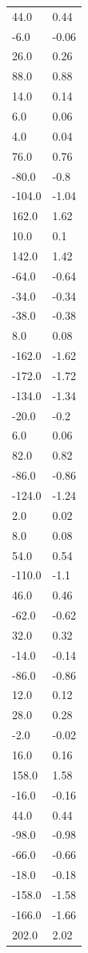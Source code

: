 \begin{longtable}{ll}
44.0 & 0.44 \\
-6.0 & -0.06 \\
26.0 & 0.26 \\
88.0 & 0.88 \\
14.0 & 0.14 \\
6.0 & 0.06 \\
4.0 & 0.04 \\
76.0 & 0.76 \\
-80.0 & -0.8 \\
-104.0 & -1.04 \\
162.0 & 1.62 \\
10.0 & 0.1 \\
142.0 & 1.42 \\
-64.0 & -0.64 \\
-34.0 & -0.34 \\
-38.0 & -0.38 \\
8.0 & 0.08 \\
-162.0 & -1.62 \\
-172.0 & -1.72 \\
-134.0 & -1.34 \\
-20.0 & -0.2 \\
6.0 & 0.06 \\
82.0 & 0.82 \\
-86.0 & -0.86 \\
-124.0 & -1.24 \\
2.0 & 0.02 \\
8.0 & 0.08 \\
54.0 & 0.54 \\
-110.0 & -1.1 \\
46.0 & 0.46 \\
-62.0 & -0.62 \\
32.0 & 0.32 \\
-14.0 & -0.14 \\
-86.0 & -0.86 \\
12.0 & 0.12 \\
28.0 & 0.28 \\
-2.0 & -0.02 \\
16.0 & 0.16 \\
158.0 & 1.58 \\
-16.0 & -0.16 \\
44.0 & 0.44 \\
-98.0 & -0.98 \\
-66.0 & -0.66 \\
-18.0 & -0.18 \\
-158.0 & -1.58 \\
-166.0 & -1.66 \\
202.0 & 2.02 \\

\end{longtable}
